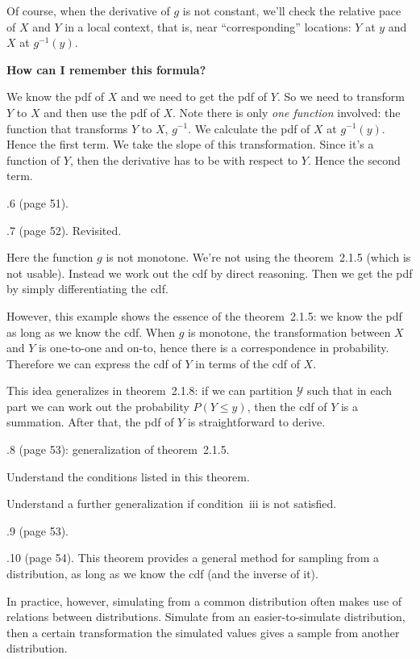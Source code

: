 \documentclass[12pt]{article}
\begin{document}
Of course,
when the derivative of $g$ is not constant,
we'll check the relative pace of $X$ and $Y$ in a local context,
that is, near ``corresponding'' locations:
$Y$ at $y$ and $X$ at $g^{-1}(y)$.

\textbf{How can I remember this formula?}

We know the pdf of $X$ and we need to get the pdf of $Y$.
So we need to transform $Y$ to $X$ and then use the pdf of $X$.
Note there is only \emph{one function} involved: the function that
transforms $Y$ to $X$, \ie $g^{-1}$.
We calculate the pdf of $X$ at $g^{-1}(y)$.
Hence the first term.
We take the slope of this transformation.
Since it's a function of $Y$, then the derivative has to be with respect
to $Y$. Hence the second term.

.6 (page 51).

.7 (page 52). Revisited.

Here the function $g$ is not monotone.
We're not using the theorem~2.1.5 (which is not usable).
Instead we work out the cdf by direct reasoning.
Then we get the pdf by simply differentiating the cdf.

However, this example shows the essence of the theorem~2.1.5:
we know the pdf as long as we know the cdf.
When $g$ is monotone, the transformation between $X$ and $Y$ is
one-to-one and on-to, hence there is a correspondence in probability.
Therefore we can express the cdf of $Y$ in terms of the cdf of $X$.

This idea generalizes in theorem~2.1.8:
if we can partition $\mathcal{Y}$ such that in each part
we can work out the probability $P(Y \le y)$,
then the cdf of $Y$ is a summation.
After that, the pdf of $Y$ is straightforward to derive.

.8 (page 53): generalization of theorem~2.1.5.

Understand the conditions listed in this theorem.

Understand a further generalization if condition~iii is not satisfied.

.9 (page 53).

.10 (page 54). This theorem provides a general method
for sampling from a distribution, as long as we know the cdf (and
the inverse of it).

In practice, however,
simulating from a common distribution often makes use of
relations between distributions.
Simulate from an easier-to-simulate distribution,
then a certain transformation the simulated values
gives a sample from another distribution.
\end{document}
